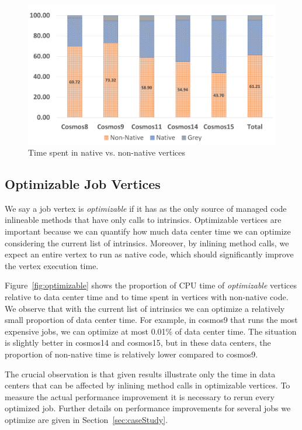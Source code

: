 \begin{figure}[ht]
\includegraphics[scale = 0.7]{graphs/proportions}
\caption{Time spent in native vs. non-native vertices}
\label{fig:nativeVsNonNative}
\end{figure}

\subsection{Optimizable Job Vertices}


We say a job vertex is \emph{optimizable} if it has as the only source of managed code inlineable methods that have only calls to intrinsics. Optimizable vertices are important because we can quantify how much data center time we can optimize considering the current list of intrinsics. Moreover, by inlining method calls, we expect an entire vertex to run as native code, which should significantly improve the vertex execution time.

Figure~\ref{fig:optimizable} shows the proportion of CPU time of \emph{optimizable} vertices relative to data center time and to time spent in vertices with non-native code. We observe that with the current list of intrinsics we can optimize a relatively small proportion of data center time. For example, in cosmos9 that runs the most expensive jobs, we can optimize at most 0.01\% of data center time. The situation is slightly better in cosmos14 and cosmos15, but in these data centers, the proportion of non-native time is relatively lower compared to cosmos9.

The crucial observation is that given results illustrate only the time in data centers that can be affected by inlining method calls in optimizable vertices. To measure the actual performance improvement it is necessary to rerun every optimized job. Further details on performance improvements for several jobs we optimize are given in Section~\ref{sec:caseStudy}.

